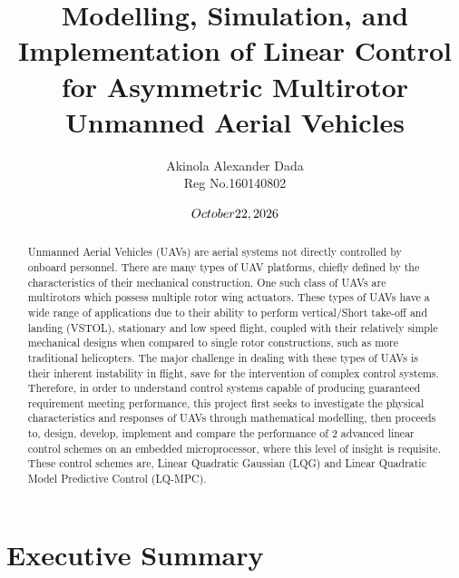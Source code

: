 \documentclass[12pt,a4paper,twoside]{report}
\title{ Modelling, Simulation, and Implementation of Linear Control for Asymmetric Multirotor Unmanned Aerial Vehicles}
\author{Akinola Alexander Dada \\ Reg No.160140802}
\date{$\today$}
\begin{document}
		
	\maketitle
	
	\newpage
	
	\tableofcontents
	
	\newpage
	
	\listoffigures
	
	\newpage
	
	\listoftables
	
	\newpage
	
	\begin{abstract}
		Unmanned Aerial Vehicles (UAVs) are aerial systems not directly controlled by onboard personnel. There are many types of UAV platforms, chiefly defined by the characteristics of their mechanical construction. One such class of UAVs are multirotors which possess multiple rotor wing actuators. These types of UAVs have a wide range of applications due to their ability to perform vertical/Short take-off and landing (VSTOL), stationary and low speed flight, coupled with their relatively simple mechanical designs when compared to single rotor constructions, such as more traditional helicopters. The major challenge in dealing with these types of UAVs is their inherent instability in flight, save for the intervention of complex control systems. Therefore, in order to understand control systems capable of producing guaranteed requirement meeting performance, this project first seeks to investigate the physical characteristics and responses of UAVs through mathematical modelling, then proceeds to, design, develop, implement and compare the performance of 2 advanced linear control schemes on an embedded microprocessor, where this level of insight is requisite. These control schemes are, Linear Quadratic Gaussian (LQG) and Linear Quadratic Model Predictive Control (LQ-MPC). 
	\end{abstract}
	\newpage
	
	\section*{Executive Summary}
	
\end{document}
